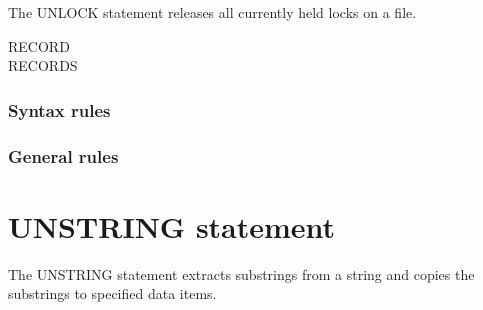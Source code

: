 The UNLOCK statement releases all currently held locks on a file.

\begin{syntax}
   \filename
  \begin{0-1}
    RECORD \\
    RECORDS
  \end{0-1}
\end{syntax}

\subsubsection{Syntax rules}

\subsubsection{General rules}

\section{UNSTRING statement}

The UNSTRING statement extracts substrings from a string and copies the substrings to specified data items.

